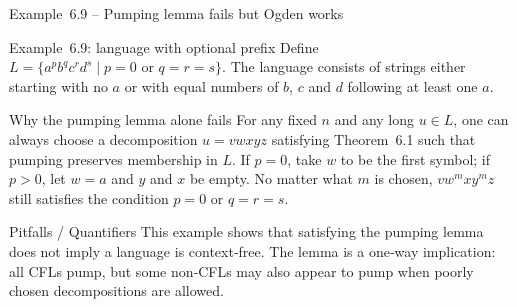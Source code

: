 \begin{frame}[t]{Example 6.9 – Pumping lemma fails but Ogden works}
  \begin{texample}{Example 6.9: language with optional prefix}
    Define $L = \{ a^p b^q c^r d^s \mid p=0 \text{ or } q=r=s \}$.  The
    language consists of strings either starting with no $a$ or with
    equal numbers of $b$, $c$ and $d$ following at least one $a$.
  \end{texample}
  \begin{tblock}{Why the pumping lemma alone fails}
    For any fixed $n$ and any long $u \in L$, one can always choose a
    decomposition $u = v w x y z$ satisfying Theorem 6.1 such that
    pumping preserves membership in $L$.  If $p=0$, take $w$ to be the
    first symbol; if $p>0$, let $w=a$ and $y$ and $x$ be empty.  No
    matter what $m$ is chosen, $v w^m x y^m z$ still satisfies the
    condition $p=0$ or $q=r=s$.
  \end{tblock}
  \begin{talert}{Pitfalls / Quantifiers}
    This example shows that satisfying the pumping lemma does not imply
    a language is context‑free.  The lemma is a one‑way implication: all
    CFLs pump, but some non‑CFLs may also appear to pump when poorly
    chosen decompositions are allowed.
  \end{talert}
  \label{fr:6.1-26}
\end{frame}

